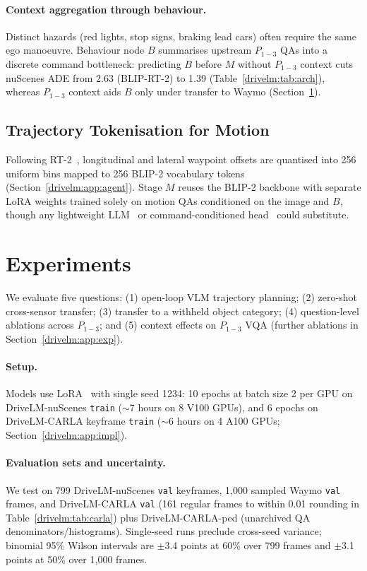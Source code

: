 \paragraph{Context aggregation through behaviour.}
Distinct hazards (red lights, stop signs, braking lead cars) often require the same ego manoeuvre. Behaviour node $B$ summarises upstream $P_{1-3}$ QAs into a discrete command bottleneck: predicting $B$ before $M$ without $P_{1-3}$ context cuts nuScenes ADE from 2.63 (BLIP-RT-2) to 1.39 (Table~\ref{drivelm:tab:arch}), whereas $P_{1-3}$ context aids $B$ only under transfer to Waymo (Section~\ref{drivelm:sec:experiments}).

\subsection{Trajectory Tokenisation for Motion}\label{drivelm:sec:traj_token}

Following RT-2~\cite{zitkovich2023rt2}, longitudinal and lateral waypoint offsets are quantised into 256 uniform bins mapped to 256 BLIP-2 vocabulary tokens (Section~\ref{drivelm:app:agent}). Stage $M$ reuses the BLIP-2 backbone with separate LoRA weights trained solely on motion QAs conditioned on the image and $B$, though any lightweight LLM~\cite{radford2019language} or command-conditioned head~\cite{hu2022stp3,wu2022tcp} could substitute.

\section{Experiments}\label{drivelm:sec:experiments}

We evaluate five questions: (1) open-loop VLM trajectory planning; (2) zero-shot cross-sensor transfer; (3) transfer to a withheld object category; (4) question-level ablations across $P_{1-3}$; and (5) context effects on $P_{1-3}$ VQA (further ablations in Section~\ref{drivelm:app:exp}).

\paragraph{Setup.}
Models use LoRA~\cite{hu2021lora} with single seed 1234: 10 epochs at batch size 2 per GPU on DriveLM-nuScenes \texttt{train} ($\sim$7 hours on 8 V100 GPUs), and 6 epochs on DriveLM-CARLA keyframe \texttt{train} ($\sim$6 hours on 4 A100 GPUs; Section~\ref{drivelm:app:impl}).

\paragraph{Evaluation sets and uncertainty.}
We test on 799 DriveLM-nuScenes \texttt{val} keyframes, 1,000 sampled Waymo \texttt{val} frames, and DriveLM-CARLA \texttt{val} (161 regular frames to within 0.01 rounding in Table~\ref{drivelm:tab:carla}) plus DriveLM-CARLA-ped (unarchived QA denominators/histograms). Single-seed runs preclude cross-seed variance; binomial 95\% Wilson intervals are $\pm$3.4 points at 60\% over 799 frames and $\pm$3.1 points at 50\% over 1,000 frames.


